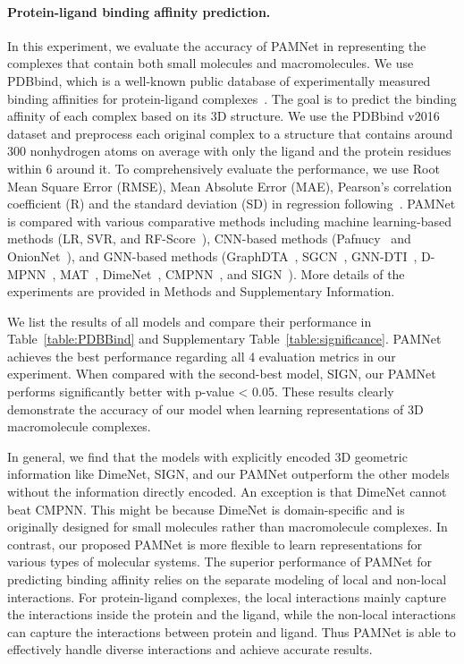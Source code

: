 \documentclass[fleqn,10pt]{wlscirep}
\newcommand{\method}{PAMNet\xspace}
\begin{document}
\paragraph{Protein-ligand binding affinity prediction.}
In this experiment, we evaluate the accuracy of \method in representing the complexes that contain both small molecules and macromolecules. We use PDBbind, which is a well-known public database of experimentally measured binding affinities for protein-ligand complexes~\cite{wang2004pdbbind}. The goal is to predict the binding affinity of each complex based on its 3D structure. We use the PDBbind v2016 dataset and preprocess each original complex to a structure that contains around 300 nonhydrogen atoms on average with only the ligand and the protein residues within 6 around it. To comprehensively evaluate the performance, we use Root Mean Square Error (RMSE), Mean Absolute Error (MAE), Pearson’s correlation coefficient (R) and the standard deviation (SD) in regression following~\cite{li2021structure}. \method is compared with various comparative methods including machine learning-based methods (LR, SVR, and RF-Score~\cite{ballester2010machine}), CNN-based methods (Pafnucy~\cite{stepniewska2018development} and OnionNet~\cite{zheng2019onionnet}), and GNN-based methods (GraphDTA~\cite{nguyen2021graphdta}, SGCN~\cite{danel2020spatial}, GNN-DTI~\cite{lim2019predicting}, D-MPNN~\cite{yang2019analyzing}, MAT~\cite{maziarka2020molecule},
DimeNet~\cite{klicpera_dimenet_2020}, CMPNN~\cite{song2020communicative}, and SIGN~\cite{li2021structure}). More details of the experiments are provided in Methods and Supplementary Information. 

We list the results of all models and compare their performance in Table~\ref{table:PDBBind} and Supplementary Table~\ref{table:significance}. \method achieves the best performance regarding all 4 evaluation metrics in our experiment. When compared with the second-best model, SIGN, our \method performs significantly better with p-value < 0.05. These results clearly demonstrate the accuracy of our model when learning representations of 3D macromolecule complexes. 

In general, we find that the models with explicitly encoded 3D geometric information like DimeNet, SIGN, and our \method outperform the other models without the information directly encoded. An exception is that DimeNet cannot beat CMPNN. This might be because DimeNet is domain-specific and is originally designed for small molecules rather than macromolecule complexes. In contrast, our proposed \method is more flexible to learn representations for various types of molecular systems. The superior performance of \method for predicting binding affinity relies on the separate modeling of local and non-local interactions. For protein-ligand complexes, the local interactions mainly capture the interactions inside the protein and the ligand, while the non-local interactions can capture the interactions between protein and ligand. Thus \method is able to effectively handle diverse interactions and achieve accurate results.
\end{document}
